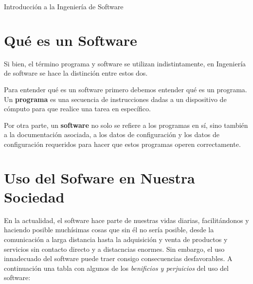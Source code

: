 \documentclass[11pt, a4paper]{article} %
\newcommand{\theTitle}{Introducción a la Ingeniería de Software}
\begin{document}
    \restoregeometry %

    \clearpage
    \tableofcontents


    \clearpage
    \listoftables


    \clearpage
    \vspace*{6pt}
    \centerline{\huge \theTitle}
    \vspace*{8pt}


    \section{Qué es un Software}

    Si bien, el término programa y software se utilizan indistintamente, en Ingeniería de software
    se hace la distinción entre estos dos.

    Para entender qué es un software primero debemos entender qué es un programa. Un
    \textbf{programa} es una secuencia de instrucciones dadas a un dispositivo de cómputo para
    que realice una tarea en específico.

    Por otra parte, un \textbf{software} no solo se refiere a los programas en sí, sino
    también a la documentación asociada, a los datos de configuración y los datos de configuración
    requeridos para hacer que estos programas operen correctamente.

    \section{Uso del Sofware en Nuestra Sociedad}

    En la actualidad, el software hace parte de nuestras vidas diarias, facilitándonos y
    haciendo posible muchísimas cosas que sin él no sería posible, desde la comunicación a
    larga distancia hasta la adquisición y venta de productos y servicios sin contacto directo
    y a distacncias enormes. Sin embargo, el uso innadecuado del software puede traer consigo
    consecuencias desfavorables. A continuación una tabla con algunos de los \textit{benificios
    y perjuicios} del uso del software:
\end{document}
